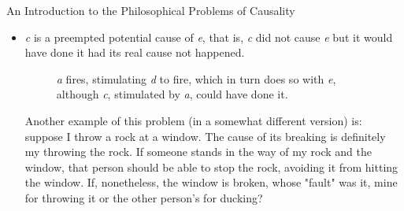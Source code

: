 \documentclass[12pt]{article}
\begin{document}
\begin{section}{An Introduction to the Philosophical Problems of Causality}
\begin{itemize}
In this case, the firing of \textit{c} was some "collateral" effect from the firing of \textit{a}, the true cause of \textit{e}. Another similar example could be:

\begin{figure}[H]
\centering
{}
\caption{\textit{c} is either simultaneous or precedes the firing of \textit{e} but does not "contribute" to its occurrence. \cite{collins_causation_2004}}
\end{figure}

\item \textit{c} is a preempted potential cause of \textit{e}, that is, \textit{c} did not cause \textit{e} but it would have done it had its real cause not happened.

\begin{figure}[H]
\centering
{}
\caption{\textit{a} fires, stimulating \textit{d} to fire, which in turn does so with \textit{e}, although \textit{c}, stimulated by \textit{a}, could have done it. \cite{collins_causation_2004}}
\end{figure}

Another example of this problem (in a somewhat different version) is: suppose I throw a rock at a window. The cause of its breaking is definitely my throwing the rock. If someone stands in the way of my rock and the window, that person should be able to stop the rock, avoiding it from hitting the window. If, nonetheless, the window is broken, whose "fault" was it, mine for throwing it or the other person's for ducking?

\end{itemize}


\end{section}
\end{document}
